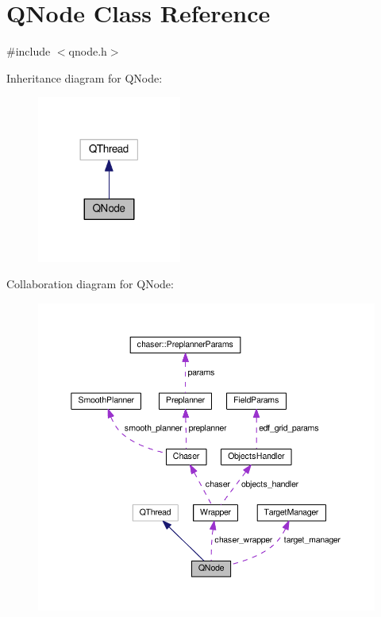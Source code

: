 \hypertarget{class_q_node}{}\section{Q\+Node Class Reference}
\label{class_q_node}


{\ttfamily \#include $<$qnode.\+h$>$}



Inheritance diagram for Q\+Node\+:\nopagebreak
\begin{figure}[H]
\begin{center}
\leavevmode
\includegraphics[width=134pt]{class_q_node__inherit__graph}
\end{center}
\end{figure}


Collaboration diagram for Q\+Node\+:
\nopagebreak
\begin{figure}[H]
\begin{center}
\leavevmode
\includegraphics[width=350pt]{class_q_node__coll__graph}
\end{center}
\end{figure}
